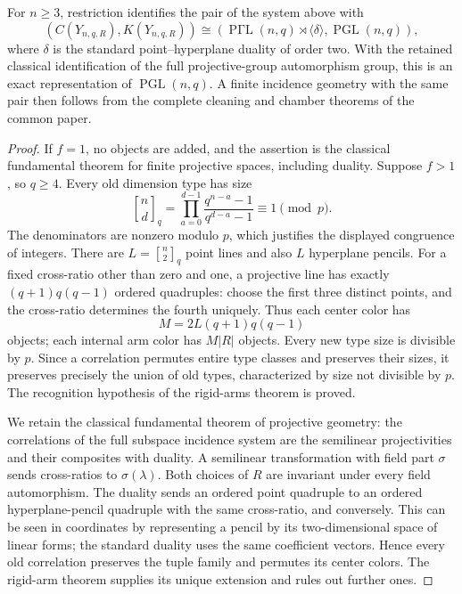 \begin{theorem}
\label{A126.OrderedProjective}
For $n\ge3$, restriction identifies the pair of the system above with
\[
(C(Y_{n,q,R}),K(Y_{n,q,R}))
 \cong
(\operatorname{P\Gamma L}(n,q)\rtimes\langle\delta\rangle,
 \operatorname{PGL}(n,q)),
\]
where $\delta$ is the standard point--hyperplane duality of order two.
With the retained classical identification of the full projective-group
automorphism group, this is an exact representation of
$\operatorname{PGL}(n,q)$. A finite incidence geometry with the same pair
then follows from the complete cleaning and chamber theorems of the
common paper.
\end{theorem}
\begin{proof}
If $f=1$, no objects are added, and the assertion is the classical
fundamental theorem for finite projective spaces, including duality.
Suppose $f>1$, so $q\ge4$. Every old dimension type has size
\[
 {n\brack d}_q=
 \prod_{a=0}^{d-1}\frac{q^{n-a}-1}{q^{d-a}-1}
 \equiv1\pmod p.
\]
The denominators are nonzero modulo $p$, which justifies the displayed
congruence of integers. There are $L={n\brack2}_q$ point lines and
also $L$ hyperplane pencils. For a fixed cross-ratio other than zero
and one, a projective line has exactly $(q+1)q(q-1)$ ordered quadruples:
choose the first three distinct points, and the cross-ratio determines
the fourth uniquely. Thus each center color has
\[
 M=2L(q+1)q(q-1)
\]
objects; each internal arm color has $M|R|$ objects. Every new type
size is divisible by $p$. Since a correlation permutes entire type
classes and preserves their sizes, it preserves precisely the union
of old types, characterized by size not divisible by $p$.
The recognition hypothesis of the rigid-arms theorem is proved.

We retain the classical fundamental theorem of projective geometry:
the correlations of the full subspace incidence system are the
semilinear projectivities and their composites with duality. A
semilinear transformation with field part $\sigma$ sends cross-ratios
to $\sigma(\lambda)$. Both choices of $R$ are invariant under every
field automorphism. The duality sends an ordered point quadruple to
an ordered hyperplane-pencil quadruple with the same cross-ratio,
and conversely. This can be seen in coordinates by representing a
pencil by its two-dimensional space of linear forms; the standard
duality uses the same coefficient vectors. Hence every old correlation
preserves the tuple family and permutes its center colors. The rigid-arm
theorem supplies its unique extension and rules out further ones.


\end{proof}
